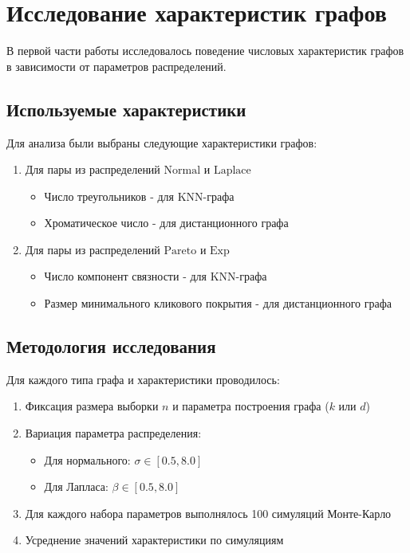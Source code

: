 \documentclass[a4paper,12pt]{article}
\begin{document}
\section{Исследование характеристик графов}
В первой части работы исследовалось поведение числовых характеристик графов в зависимости от параметров распределений.

\subsection{Используемые характеристики}
Для анализа были выбраны следующие характеристики графов:
\begin{enumerate}
    \item Для пары из распределений $\text{Normal}$ и $\text{Laplace}$
    \begin{itemize}
        \item Число треугольников - для KNN-графа
        \item Хроматическое число - для дистанционного графа
    \end{itemize}

    \item Для пары из распределений $\text{Pareto}$ и $\text{Exp}$
    \begin{itemize}
        \item Число компонент связности - для KNN-графа
        \item Размер минимального кликового покрытия - для дистанционного графа
    \end{itemize}
\end{enumerate}

\subsection{Методология исследования}
Для каждого типа графа и характеристики проводилось:
\begin{enumerate}
    \item Фиксация размера выборки $n$ и параметра построения графа ($k$ или $d$)
    \item Вариация параметра распределения:
    \begin{itemize}
        \item Для нормального: $\sigma \in [0.5, 8.0]$
        \item Для Лапласа: $\beta \in [0.5, 8.0]$
    \end{itemize}
    \item Для каждого набора параметров выполнялось 100 симуляций Монте-Карло
    \item Усреднение значений характеристики по симуляциям
\end{enumerate}
\end{document}
